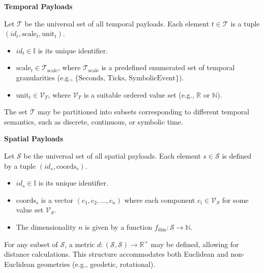 \textbf{Temporal Payloads}\newline 

\begin{definition}
\label{def:contextoid_paylod_temporal}
Let \(\mathcal{T}\) be the universal set of all temporal payloads. Each element \(t \in \mathcal{T}\) is a tuple \( (id_t, \text{scale}_t, \text{unit}_t) \).
\begin{itemize}
    \item \(id_t \in \mathbb{I}\) is its unique identifier.
    \item \(\text{scale}_t \in \mathcal{T}_{\text{scale}}\), where \(\mathcal{T}_{\text{scale}}\) is a predefined enumerated set of temporal granularities (e.g., \(\{\text{Seconds, Ticks, SymbolicEvent}\}\)).
    \item \(\text{unit}_t \in \mathcal{V}_T\), where \(\mathcal{V}_T\) is a suitable ordered value set (e.g., \(\mathbb{R}\) or \(\mathbb{N}\)).
\end{itemize}
\end{definition}
The set \(\mathcal{T}\) may be partitioned into subsets corresponding to different temporal semantics, such as discrete, continuous, or symbolic time.

\textbf{Spatial Payloads}\newline 

\begin{definition}
\label{def:contextoid_paylod_spatial}
Let \(\mathcal{S}\) be the universal set of all spatial payloads. Each element \(s \in \mathcal{S}\) is defined by a tuple \( (id_s, \text{coords}_s) \).
\begin{itemize}
    \item \(id_s \in \mathbb{I}\) is its unique identifier.
    \item \(\text{coords}_s\) is a vector \( (c_1, c_2, \dots, c_n) \) where each component \(c_i \in \mathcal{V}_S\) for some value set \(\mathcal{V}_S\).
    \item The dimensionality \(n\) is given by a function \(f_{\text{dim}}: \mathcal{S} \to \mathbb{N}\).
\end{itemize}
For any subset of \(\mathcal{S}\), a metric \(d: (\mathcal{S}, \mathcal{S}) \to \mathbb{R}^+\) may be defined, allowing for distance calculations. This structure accommodates both Euclidean and non-Euclidean geometries (e.g., geodetic, rotational).
\end{definition}

